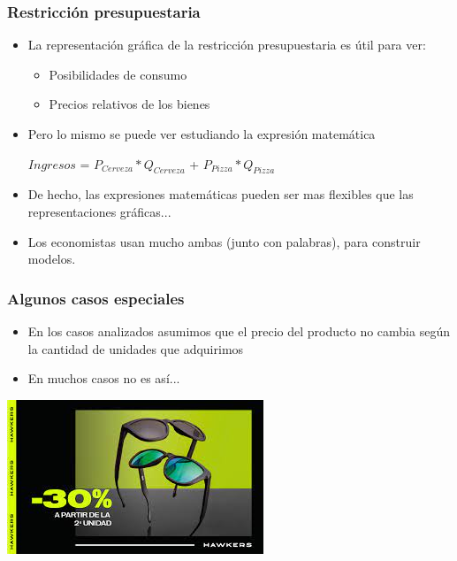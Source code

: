 \documentclass{beamer}
\begin{document}
\begin{frame}
\frametitle{Restricción presupuestaria}
\begin{itemize}
    \item La representación gráfica de la restricción presupuestaria es útil para ver:
    \begin{itemize}
        \item Posibilidades de consumo
        \item Precios relativos de los bienes
    \end{itemize}
    \item Pero lo mismo se puede ver estudiando la expresión matemática \\ \vspace{2mm}
    \begin{center}
    $Ingresos$ = $P_{Cerveza} * Q_{Cerveza}$ + $P_{Pizza} * Q_{Pizza}$
    \\
    \end{center}\vspace{2mm}
    \item De hecho, las expresiones matemáticas pueden ser mas flexibles que las representaciones gráficas...
    \item Los economistas usan mucho ambas (junto con palabras), para construir modelos.
\end{itemize} 
\end{frame}

\begin{frame}
\frametitle{Algunos casos especiales}
\begin{itemize}
\item En los casos analizados asumimos que el precio del producto no cambia según la cantidad de unidades que adquirimos
\item En muchos casos no es así...
\end{itemize}
\vspace{3mm}
\centering
\includegraphics[scale=0.55]{../Figures/Lentes.jpeg}
\end{frame}
\end{document}

